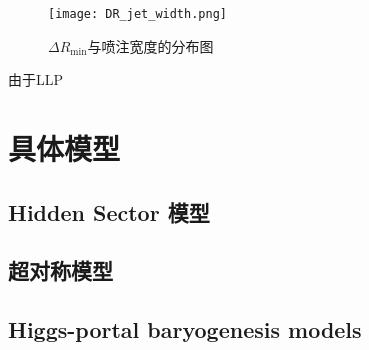 \begin{figure}[ht]
    \centering
    \texttt{[image: DR\_jet\_width.png]}
    \caption{$\Delta R_{\min}$与喷注宽度的分布图}
    \label{fig:DR_jet_width}
\end{figure}

由于LLP


\section{具体模型}

\subsection{Hidden Sector 模型}

\subsection{超对称模型}

\subsection{Higgs-portal baryogenesis models}


